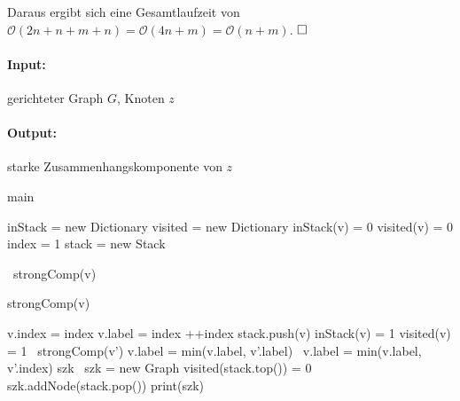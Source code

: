\documentclass[12pt]{scrartcl}%
\theoremstyle{nonumberplain}
\newcommand{\bO}[1]{\mathcal O(#1)}
\begin{document}
Daraus ergibt sich eine Gesamtlaufzeit von $\bO{2n + n + m + n} = \bO{4n + m} = \bO{n+m}$.
$\hfill\square$

\paragraph{Input:} gerichteter Graph $G$, Knoten $z$
\paragraph{Output:} starke Zusammenhangskomponente von $z$

\begin{algorithm}
	\caption{main}
		
	inStack = new Dictionary\;
	visited = new Dictionary\;
	 {
		inStack(v) = 0\;
		visited(v) = 0\;	
	}
	index = 1\;
	stack = new Stack\;
	
	 {
		 {\
			strongComp(v)\;
		}
	}
\end{algorithm}

\begin{algorithm}
	\caption{strongComp(v)}
	
	v.index = index\;
	v.label = index\;
	++index\;
	stack.push(v)\;
	inStack(v) = 1\;
	visited(v) = 1\;
	 {
		 {\
			strongComp(v')\;
			v.label = min(v.label, v'.label)\;	
		}  {\
			v.label = min(v.label, v'.index)\;
		}
	}
	szk\;
	 {\
		szk = new Graph\;
		 {
			visited(stack.top()) = 0\;
			szk.addNode(stack.pop())\;
		}
		print(szk)\;
	}
\end{algorithm}
\end{document}
